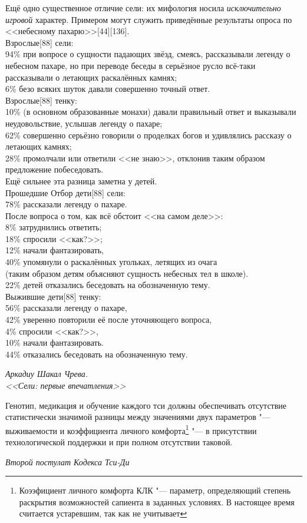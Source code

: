 \documentclass[a4paper,10pt]{book}
\begin{document}
\epigraph{Ещё одно существенное отличие сели: их мифология носила 
\textit{исключительно игровой} характер. Примером могут служить приведённые 
результаты опроса по <<небесному пахарю>>[44][136].\\
Взрослые[88] сели:\\
94\% при вопросе о сущности падающих звёзд, смеясь, рассказывали легенду о 
небесном пахаре, но при переводе беседы в серьёзное русло всё-таки рассказывали 
о летающих раскалённых камнях;\\
6\% безо всяких шуток давали совершенно точный ответ.\\
Взрослые[88] тенку:\\
10\% (в основном образованные монахи) давали правильный ответ и выказывали 
неудовольствие, услышав легенду о пахаре;\\
62\% совершенно серьёзно говорили о проделках богов и удивлялись рассказу о 
летающих камнях;\\
28\% промолчали или ответили <<не знаю>>, отклонив таким образом предложение 
побеседовать.\\
Ещё сильнее эта разница заметна у детей.\\ 
Прошедшие Отбор дети[88] сели:\\
78\% рассказали легенду о пахаре.\\
После вопроса о том, как всё обстоит <<на самом деле>>:\\ 
8\% затруднились ответить;\\
18\% спросили <<как?>>;\\
12\% начали фантазировать,\\
40\% упомянули о раскалённых угольках, летящих из очага\\
(таким образом детям объясняют сущность небесных тел в школе).\\
22\% детей отказались беседовать на обозначенную тему.\\
Выжившие дети[88] тенку:\\
56\% рассказали легенду о пахаре,\\
42\% уверенно повторили её после уточняющего вопроса,\\
4\% спросили <<как?>>,\\
10\% начали фантазировать.\\
44\% отказались беседовать на обозначенную тему.}
{\textit{Аркадиу Шакал Чрева.\\<<Сели: первые впечатления>>}}

\epigraph{Генотип, медикация и обучение каждого тси должны обеспечивать 
отсутствие статистически значимой разницы между значениями двух параметров "--- 
выживаемости и коэффициента личного комфорта\footnote{Коээфициент личного 
комфорта КЛК "--- параметр, определяющий степень раскрытия возможностей 
сапиента в заданных условиях. В настоящее время считается устаревшим, так как 
не учитывает } "--- в присутствии технологической поддержки и при полном 
отсутствии таковой.}
{\textit{Второй постулат Кодекса Тси-Ди}}
\end{document}
